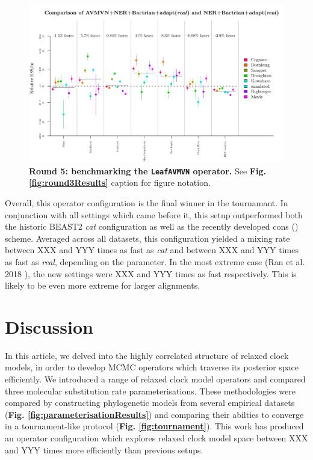 \documentclass[10pt,letterpaper]{article}
\begin{document}
\begin{figure}[!h]
\includegraphics[width=\textwidth]{benchmarking/benchmarkingVM/ESS_round5.pdf}
\caption{\textbf{Round 5: benchmarking the \texttt{LeafAVMVN} operator.} See \textbf{Fig. \ref{fig:round3Results}} caption for figure notation.  }
\label{fig:round5Results}
\end{figure}



Overall, this operator configuration is the final winner in the tournamant. In conjunction with all settings which came before it, this setup outperformed both the historic BEAST2 \textit{cat} configuration as well as the recently developed cons () \cite{zhang2020improving} scheme.
Averaged across all datasets, this configuration yielded a mixing rate between XXX and YYY times as fast as \textit{cat} and between XXX and YYY times as fast as \textit{real}, depending on the parameter.
In the most extreme case (Ran et al. 2018 \cite{Ran_2018}), the new settings were XXX and YYY times as fast respectively.
This is likely to be even more extreme for larger alignments.


\newpage
\section*{Discussion} \label{sect:discussion}


In this article, we delved into the highly correlated structure of relaxed clock models, in order to develop MCMC operators which traverse its posterior space efficiently.
We introduced a range of relaxed clock model operators and compared three molecular substitution rate parameterisations.
These methodologies were compared by constructing phylogenetic models from several empirical datasets (\textbf{Fig. \ref{fig:parameterisationResults}}) and comparing their abilties to converge in a tournament-like protocol (\textbf{Fig. \ref{fig:tournament}}).
This work has produced an operator configuration which explores relaxed clock model space between XXX and YYY times more efficiently than previous setups.
\end{document}
